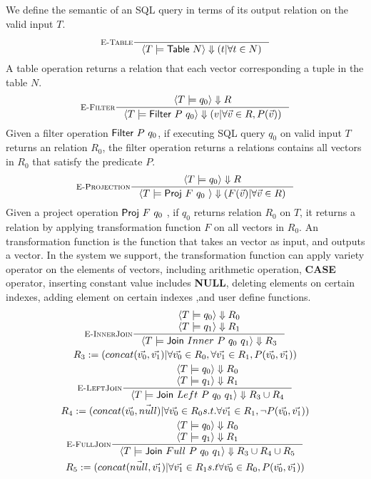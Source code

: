 We define the semantic of an SQL query in terms of its output relation on the valid input $T$.
\begin{gather*}
  \inference[$\textsc{E-Table}$]{%
  }{%
  \evaluation{T}{\STable{N}}{( t | \forall t \in N)}
  }
\end{gather*}
%
A table operation returns a relation that each vector corresponding a tuple in the table $N$.
%
\begin{gather*}
  \inference[$\textsc{E-Filter}$]{%
  \evaluation{T}{q_0}{R}
  }{%
    \evaluation{T}{\SFilter{P}{q_0}}{(v| \forall \vec{v} \in R,P(\vec{v}))}
  }
\end{gather*}
%
Given a filter operation $\textsf{Filter}~P~q_0$, if executing SQL query $q_0$ on valid input $T$ returns an relation $R_0$, the filter operation
returns a relations contains all vectors in $R_0$ that satisfy the predicate $P$.
%
\begin{gather*}
  \inference[$\textsc{E-Projection}$]{%
    \evaluation{T}{q_0}{R}
  }{%
    \evaluation{T}{\SProj{F}{q_0}}{( F(\vec{v}) | \forall \vec{v} \in R)}
  }
\end{gather*}
%
Given a project operation $\textsf{Proj}~F~q_0~$, if $q_0$ returns relation $R_0$ on $T$, it returns a relation by applying transformation function 
$F$ on all vectors in $R_0$.
%
An transformation function is the function that takes an vector as input, and outputs a vector.
%
In the system we support, the transformation function can apply variety operator on the elements of vectors, 
including arithmetic operation, \textbf{CASE} operator, inserting constant value includes \textbf{NULL}, deleting elements on certain indexes, adding 
element on certain indexes ,and user define functions. 
%
\begin{gather*}
  \inference[$\textsc{E-InnerJoin}$]{%
    \evaluation{T}{q_0}{R_0}\\
    \evaluation{T}{q_1}{R_1}\\
  }{%
    \evaluation{T}{\SJoin{Inner}{P}{q_0}{q_1}}{R_3}
  }
  \\
  R_3 :=(concat(\vec{v_0},\vec{v_1}) | \forall \vec{v_0} \in R_0, \forall \vec{v_1} \in R_1, P(\vec{v_0},\vec{v_1}))
  \\
  \inference[$\textsc{E-LeftJoin}$]{
   \evaluation{T}{q_0}{R_0}\\
   \evaluation{T}{q_1}{R_1}\\
  }
  {
   \evaluation{T}{\SJoin{Left}{P}{q_0}{q_1}}{R_3 \cup R_4}
  }
  \\
  R_4 :=(concat(\vec{v_0},\vec{null}) | \forall \vec{v_0} \in R_0 s.t. \forall \vec{v_1} \in R_1, \neg P(\vec{v_0},\vec{v_1}))
  \\
 \inference[$\textsc{E-FullJoin}$]{
   \evaluation{T}{q_0}{R_0}\\
   \evaluation{T}{q_1}{R_1}\\
  }
  {
   \evaluation{T}{\SJoin{Full}{P}{q_0}{q_1}}{R_3 \cup R_4 \cup R_5}
  }
  \\
  R_5 :=(concat(\vec{null},\vec{v_1}) | \forall \vec{v_1} \in R_1 s.t \forall \vec{v_0} \in R_0, P(\vec{v_0},\vec{v_1}))
\end{gather*}
